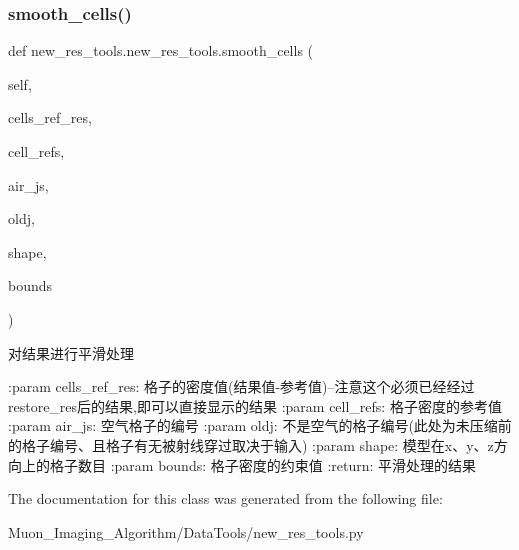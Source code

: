 \subsubsection{\texorpdfstring{smooth\+\_\+cells()}{smooth\_cells()}}
{\footnotesize\ttfamily def new\+\_\+res\+\_\+tools.\+new\+\_\+res\+\_\+tools.\+smooth\+\_\+cells (\begin{DoxyParamCaption}\item[{}]{self,  }\item[{}]{cells\+\_\+ref\+\_\+res,  }\item[{}]{cell\+\_\+refs,  }\item[{}]{air\+\_\+js,  }\item[{}]{oldj,  }\item[{}]{shape,  }\item[{}]{bounds }\end{DoxyParamCaption})}

\begin{DoxyVerb}对结果进行平滑处理

:param cells_ref_res: 格子的密度值(结果值-参考值)--注意这个必须已经经过 restore_res后的结果,即可以直接显示的结果
:param cell_refs: 格子密度的参考值
:param air_js: 空气格子的编号
:param oldj: 不是空气的格子编号(此处为未压缩前的格子编号、且格子有无被射线穿过取决于输入)
:param shape: 模型在x、y、z方向上的格子数目
:param bounds: 格子密度的约束值
:return: 平滑处理的结果
\end{DoxyVerb}
 

The documentation for this class was generated from the following file\+:\begin{DoxyCompactItemize}
\item 
Muon\+\_\+\+Imaging\+\_\+\+Algorithm/\+Data\+Tools/new\+\_\+res\+\_\+tools.\+py\end{DoxyCompactItemize}
